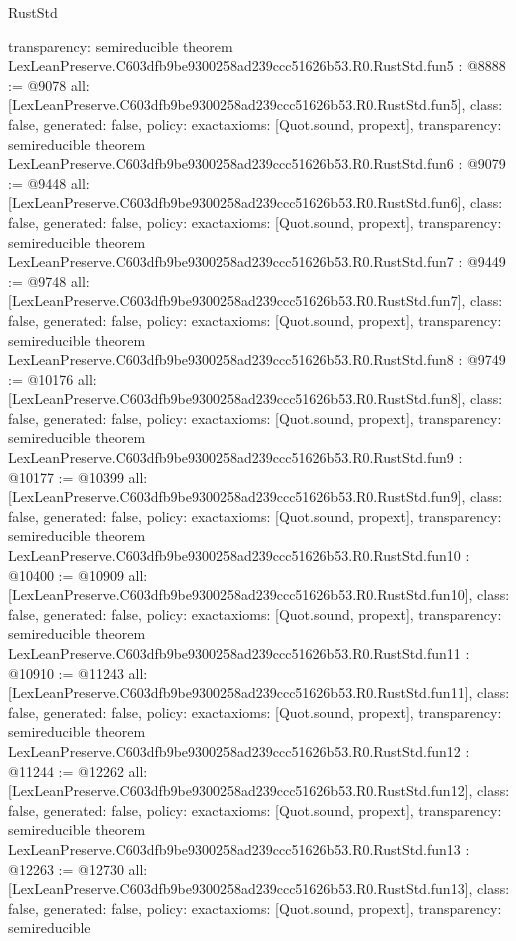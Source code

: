 \begin{lexlean}{RustStd}
\begin{coremodule}
{  transparency: semireducible
}
theorem LexLeanPreserve.C603dfb9be9300258ad239ccc51626b53.R0.RustStd.fun5 : @8888 := @9078 {
  all: [LexLeanPreserve.C603dfb9be9300258ad239ccc51626b53.R0.RustStd.fun5],
  class: false,
  generated: false,
  policy: exact{axioms: [Quot.sound, propext]},
  transparency: semireducible
}
theorem LexLeanPreserve.C603dfb9be9300258ad239ccc51626b53.R0.RustStd.fun6 : @9079 := @9448 {
  all: [LexLeanPreserve.C603dfb9be9300258ad239ccc51626b53.R0.RustStd.fun6],
  class: false,
  generated: false,
  policy: exact{axioms: [Quot.sound, propext]},
  transparency: semireducible
}
theorem LexLeanPreserve.C603dfb9be9300258ad239ccc51626b53.R0.RustStd.fun7 : @9449 := @9748 {
  all: [LexLeanPreserve.C603dfb9be9300258ad239ccc51626b53.R0.RustStd.fun7],
  class: false,
  generated: false,
  policy: exact{axioms: [Quot.sound, propext]},
  transparency: semireducible
}
theorem LexLeanPreserve.C603dfb9be9300258ad239ccc51626b53.R0.RustStd.fun8 : @9749 := @10176 {
  all: [LexLeanPreserve.C603dfb9be9300258ad239ccc51626b53.R0.RustStd.fun8],
  class: false,
  generated: false,
  policy: exact{axioms: [Quot.sound, propext]},
  transparency: semireducible
}
theorem LexLeanPreserve.C603dfb9be9300258ad239ccc51626b53.R0.RustStd.fun9 : @10177 := @10399 {
  all: [LexLeanPreserve.C603dfb9be9300258ad239ccc51626b53.R0.RustStd.fun9],
  class: false,
  generated: false,
  policy: exact{axioms: [Quot.sound, propext]},
  transparency: semireducible
}
theorem LexLeanPreserve.C603dfb9be9300258ad239ccc51626b53.R0.RustStd.fun10 : @10400 := @10909 {
  all: [LexLeanPreserve.C603dfb9be9300258ad239ccc51626b53.R0.RustStd.fun10],
  class: false,
  generated: false,
  policy: exact{axioms: [Quot.sound, propext]},
  transparency: semireducible
}
theorem LexLeanPreserve.C603dfb9be9300258ad239ccc51626b53.R0.RustStd.fun11 : @10910 := @11243 {
  all: [LexLeanPreserve.C603dfb9be9300258ad239ccc51626b53.R0.RustStd.fun11],
  class: false,
  generated: false,
  policy: exact{axioms: [Quot.sound, propext]},
  transparency: semireducible
}
theorem LexLeanPreserve.C603dfb9be9300258ad239ccc51626b53.R0.RustStd.fun12 : @11244 := @12262 {
  all: [LexLeanPreserve.C603dfb9be9300258ad239ccc51626b53.R0.RustStd.fun12],
  class: false,
  generated: false,
  policy: exact{axioms: [Quot.sound, propext]},
  transparency: semireducible
}
theorem LexLeanPreserve.C603dfb9be9300258ad239ccc51626b53.R0.RustStd.fun13 : @12263 := @12730 {
  all: [LexLeanPreserve.C603dfb9be9300258ad239ccc51626b53.R0.RustStd.fun13],
  class: false,
  generated: false,
  policy: exact{axioms: [Quot.sound, propext]},
  transparency: semireducible
}
\end{coremodule}
\end{lexlean}
